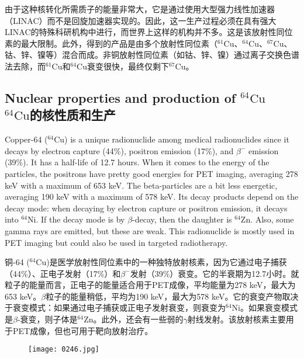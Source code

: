 \documentclass[dvipsnames, svgnames,a4paper,11pt]{article}
\begin{document}
由于这种核转化所需质子的能量非常大，它是通过使用大型强力线性加速器（LINAC）而不是回旋加速器实现的。因此，这一生产过程必须在具有强大LINAC的特殊科研机构中进行，而世界上这样的机构并不多。这是该放射性同位素的最大限制。此外，得到的产品是由多个放射性同位素（\(\mathrm{^{61}Cu}\)、\(\mathrm{^{64}Cu}\)、\(\mathrm{^{67}Cu}\)、钴、锌、镍等）混合而成。非铜放射性同位素（如钴、锌、镍）通过离子交换色谱法去除，而\(\mathrm{^{61}Cu}\)和\(\mathrm{^{64}Cu}\)衰变很快，最终仅剩下\(\mathrm{^{67}Cu}\)。

\subsection{Nuclear properties and production of \(\mathrm{^{64}Cu}\)\\ \(\mathrm{^{64}Cu}\)的核性质和生产}  
Copper-64 (\(\mathrm{^{64}Cu}\)) is a unique radionuclide among medical radionuclides since it decays by electron capture (44\%), positron emission (17\%), and \(\beta^-\) emission (39\%). It has a half-life of 12.7 hours. When it comes to the energy of the particles, the positrons have pretty good energies for PET imaging, averaging 278 keV with a maximum of 653 keV. The beta-particles are a bit less energetic, averaging 190 keV with a maximum of 578 keV. Its decay products depend on the decay mode: when decaying by electron capture or positron emission, it decays into \(\mathrm{^{64}Ni}\). If the decay mode is by \(\beta\)-decay, then the daughter is \(\mathrm{^{64}Zn}\). Also, some gamma rays are emitted, but these are weak. This radionuclide is mostly used in PET imaging but could also be used in targeted radiotherapy.  

铜-64 (\(\mathrm{^{64}Cu}\))是医学放射性同位素中的一种独特放射核素，因为它通过电子捕获（44\%）、正电子发射（17\%）和\(\beta^-\)发射（39\%）衰变。它的半衰期为12.7小时。就粒子的能量而言，正电子的能量适合用于PET成像，平均能量为278 keV，最大为653 keV。\(\beta\)粒子的能量稍低，平均为190 keV，最大为578 keV。它的衰变产物取决于衰变模式：如果通过电子捕获或正电子发射衰变，则衰变为\(\mathrm{^{64}Ni}\)。如果衰变模式是\(\beta\)-衰变，则子体是\(\mathrm{^{64}Zn}\)。此外，还会有一些弱的$\gamma$射线发射。该放射核素主要用于PET成像，但也可用于靶向放射治疗。  

\begin{figure}[h]
	\centering
    \texttt{[image: 0246.jpg]}  
     \label{fig329}
\end{figure}
\end{document}
